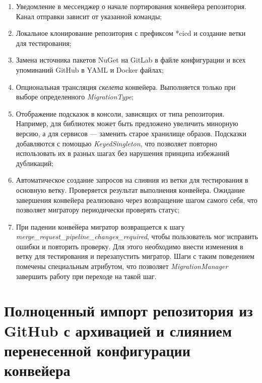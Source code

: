 \begin{enumerate}
  \item Уведомление в мессенджер о начале портирования конвейера репозитория. Канал отправки зависит от указанной команды;
  \item Локальное клонирование репозитория с префиксом *cicd и создание ветки для тестирования;
  \item Замена источника пакетов NuGet \cite{nuget} на GitLab в файле конфигурации и всех упоминаний GitHub в YAML и Docker файлах;
  \item Опциональная трансляция \emph{скелета} конвейера. Выполняется только при выборе определенного \emph{MigrationType};
  \item Отображение подсказок в консоли, зависящих от типа репозитория. Например, для библиотек может быть предложено увеличить минорную версию, а для сервисов — заменить старое хранилище образов. Подсказки добавляются с помощью \emph{KeyedSingleton}, что позволяет повторно использовать их в разных шагах без нарушения принципа избежаний дубликаций;
  \item Автоматическое создание запросов на слияния из ветки для тестирования в основную ветку. Проверяется результат выполнения конвейера. Ожидание завершения конвейера реализовано через возвращение шагом самого себя, что позволяет мигратору периодически проверять статус;
  \item При падении конвейера мигратор возвращается к шагу \emph{merge\_request\_pipeline\_changes\_required}, чтобы пользователь мог исправить ошибки и повторить проверку. Для этого необходимо внести изменения в ветку для тестирования и перезапустить мигратор. Шаги с таким поведением помечены специальным атрибутом, что позволяет \emph{MigrationManager} завершить работу при переходе на такой шаг.
\end{enumerate}

\section{Полноценный импорт репозитория из GitHub с архивацией и слиянием перенесенной конфигурации конвейера}

